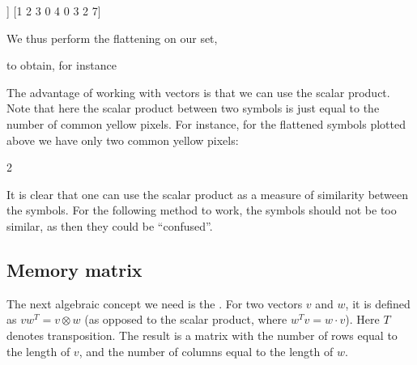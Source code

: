 \documentclass[letterpaper,10pt,english]{jupyterBook}
\begin{document}
\begin{sphinxVerbatim}[commandchars=\\\{\}]
[[1 2 3]
 [0 4 0]
 [3 2 7]]
[1 2 3 0 4 0 3 2 7]
\end{sphinxVerbatim}

\sphinxAtStartPar
We thus perform the flattening on our set,

\begin{sphinxVerbatim}[commandchars=\\\{\}]
\end{sphinxVerbatim}

\sphinxAtStartPar
to obtain, for instance

\noindent{}

\noindent{}

\sphinxAtStartPar
The advantage of working with vectors is that we can use the scalar product. Note that here the scalar product between two symbols is just equal to the number of common yellow pixels. For instance, for the flattened symbols plotted above we have only two common yellow pixels:

\begin{sphinxVerbatim}[commandchars=\\\{\}]
\end{sphinxVerbatim}

\begin{sphinxVerbatim}[commandchars=\\\{\}]
2
\end{sphinxVerbatim}

\sphinxAtStartPar
It is clear that one can use the scalar product as a measure of similarity between the symbols. For the following method to work, the symbols should not be too similar, as then they could be “confused”.


\subsection{Memory matrix}
\label{\detokenize{docs/memory:memory-matrix}}
\sphinxAtStartPar
The next algebraic concept we need is the . For two vectors \(v\) and \(w\), it is defined as \(v w^T = v \otimes w\) (as opposed to the scalar product, where \(w^T v = w \cdot v\)). Here \(T\) denotes transposition. The result is a matrix with the number of rows equal to the length of \(v\), and the number of columns equal to the length of \(w\).
\end{document}
